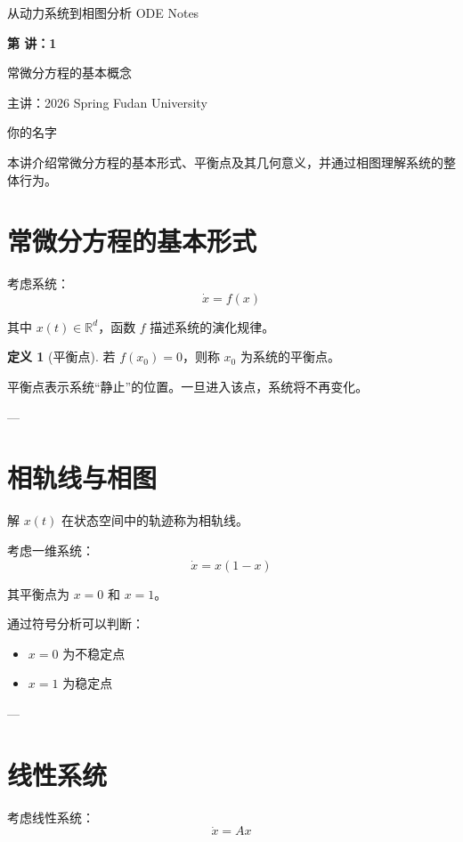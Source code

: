 \documentclass[11pt]{article}
\newcounter{lecnum}
\numberwithin{equation}{section}
\newcommand{\LectureAffiliation}{Fudan University}
\newcommand{\LectureBanner}[6]{%
  \setcounter{lecnum}{#1}%
  \setcounter{page}{1}%
  \setcounter{section}{0}%
  \setcounter{equation}{0}%
  \markright{#2}%
  \begin{tcolorbox}[
    cn-panel,
    colback=white,
    colframe=brandD!35!white,
    borderline west={4pt}{0pt}{accent}
  ]
    {\sffamily\small\color{ink!60} #4 \hfill #5}\par
    \vspace{0.35em}
    {\bfseries\fontsize{22}{26}\selectfont\color{keydark} 第 #1 讲：#2\par}
    \vspace{0.2em}
    {\large\color{brand} #3\par}
    \vspace{0.7em}
    {\small\sffamily\color{ink!72} 主讲：#6 \hfill {\color{brandD}\LectureAffiliation}}
  \end{tcolorbox}
  \vspace{0.7em}
}
\theoremstyle{plain}
\theoremstyle{definition}
\newtheorem{definition}[theorem]{定义}
\theoremstyle{remark}
\newcommand{\R}{\mathbb{R}}
\begin{document}
\LectureBanner
 \LectureBanner
  {1}
  {常微分方程的基本概念}
  {从动力系统到相图分析}
  {ODE Notes}
  {2026 Spring}
  {你的名字}

\begin{SummaryBox}
本讲介绍常微分方程的基本形式、平衡点及其几何意义，并通过相图理解系统的整体行为。
\end{SummaryBox}

\section{常微分方程的基本形式}

考虑系统：
\[
\dot{x} = f(x)
\]

其中 $x(t)\in \R^d$，函数 $f$ 描述系统的演化规律。

\begin{definition}[平衡点]
若 $f(x_0)=0$，则称 $x_0$ 为系统的平衡点。
\end{definition}

\begin{AnalysisBox}
平衡点表示系统“静止”的位置。一旦进入该点，系统将不再变化。
\end{AnalysisBox}

---

\section{相轨线与相图}

解 $x(t)$ 在状态空间中的轨迹称为相轨线。

\begin{ExampleBox}
考虑一维系统：
\[
\dot{x} = x(1-x)
\]

其平衡点为 $x=0$ 和 $x=1$。
\end{ExampleBox}

\begin{AnalysisBox}
通过符号分析可以判断：
\begin{itemize}
\item $x=0$ 为不稳定点
\item $x=1$ 为稳定点
\end{itemize}
\end{AnalysisBox}

---

\section{线性系统}

考虑线性系统：
\[
\dot{x} = Ax
\]
\end{document}
